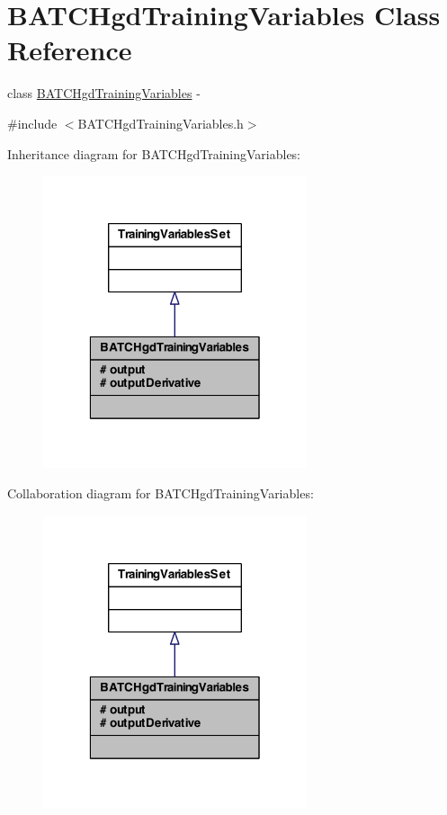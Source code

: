 \hypertarget{class_b_a_t_c_hgd_training_variables}{
\section{BATCHgdTrainingVariables Class Reference}
\label{class_b_a_t_c_hgd_training_variables}
}


class \hyperlink{class_b_a_t_c_hgd_training_variables}{BATCHgdTrainingVariables} -\/  




{\ttfamily \#include $<$BATCHgdTrainingVariables.h$>$}



Inheritance diagram for BATCHgdTrainingVariables:\nopagebreak
\begin{figure}[H]
\begin{center}
\leavevmode
\includegraphics[width=220pt]{class_b_a_t_c_hgd_training_variables__inherit__graph}
\end{center}
\end{figure}


Collaboration diagram for BATCHgdTrainingVariables:\nopagebreak
\begin{figure}[H]
\begin{center}
\leavevmode
\includegraphics[width=220pt]{class_b_a_t_c_hgd_training_variables__coll__graph}
\end{center}
\end{figure}

